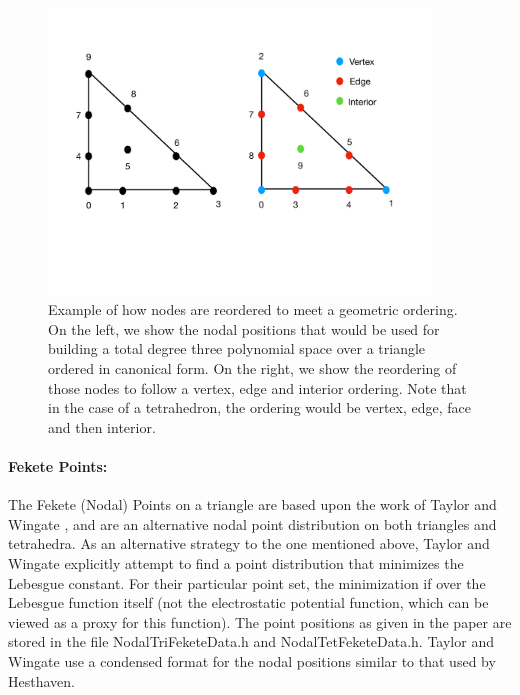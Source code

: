 \begin{figure}[htb]
\centering
\includegraphics[width=4in]{img/nodeordering.pdf}
\caption{Example of how nodes are reordered to meet a geometric ordering.  On the left, we show the nodal positions that would
be used for building a total degree three polynomial space over a triangle ordered in canonical form.  On the right, we show 
the reordering of those nodes to follow a vertex, edge and interior ordering.  Note that in the case of a tetrahedron, the
ordering would be vertex, edge, face and then interior.}
\label{foundations:nodeordering}
\end{figure}


\paragraph{Fekete Points: }

The Fekete (Nodal) Points on a triangle are based upon the work of Taylor and Wingate \cite{TaylorW99,TaylorWV00},
and are an alternative nodal point distribution on both triangles and tetrahedra. 
As an alternative strategy to the one mentioned above, Taylor and Wingate explicitly attempt to find a point
distribution that minimizes the Lebesgue constant.  For their particular point set, the minimization if over
the Lebesgue function itself (not the electrostatic potential function, which can be viewed as a proxy for this function).  
The point positions as given in the paper are stored in the file NodalTriFeketeData.h and NodalTetFeketeData.h.  
Taylor and Wingate use a condensed format for the nodal positions similar to that used by Hesthaven.

